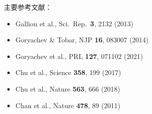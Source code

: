 \documentclass[11pt,a4paper]{article}
\begin{document}
\vspace{0.5em}
\noindent
主要参考文献：
\begin{itemize}
\item Galliou et al., Sci.\ Rep.\ \textbf{3}, 2132 (2013)
\item Goryachev \& Tobar, NJP \textbf{16}, 083007 (2014)
\item Goryachev et al., PRL \textbf{127}, 071102 (2021)
\item Chu et al., Science \textbf{358}, 199 (2017)
\item Chu et al., Nature \textbf{563}, 666 (2018)
\item Chan et al., Nature \textbf{478}, 89 (2011)
\end{itemize}
\end{document}
